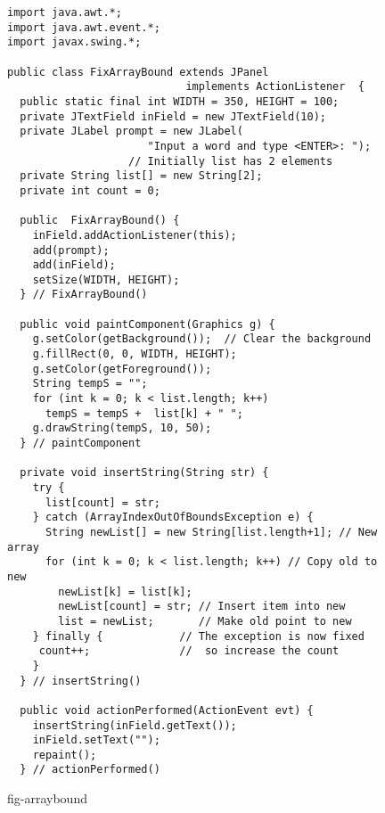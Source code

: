 \begin{figure}[p]
\jjjprogstart
\begin{jjjlisting}[29pc]
\begin{lstlisting}
import java.awt.*;
import java.awt.event.*;
import javax.swing.*;

public class FixArrayBound extends JPanel 
                            implements ActionListener  {
  public static final int WIDTH = 350, HEIGHT = 100;
  private JTextField inField = new JTextField(10);
  private JLabel prompt = new JLabel(
                      "Input a word and type <ENTER>: ");
                   // Initially list has 2 elements
  private String list[] = new String[2]; 
  private int count = 0;

  public  FixArrayBound() {
    inField.addActionListener(this);
    add(prompt);
    add(inField);
    setSize(WIDTH, HEIGHT);
  } // FixArrayBound()

  public void paintComponent(Graphics g) {
    g.setColor(getBackground());  // Clear the background
    g.fillRect(0, 0, WIDTH, HEIGHT);
    g.setColor(getForeground());
    String tempS = "";
    for (int k = 0; k < list.length; k++)
      tempS = tempS +  list[k] + " ";
    g.drawString(tempS, 10, 50);
  } // paintComponent

  private void insertString(String str) {
    try {
      list[count] = str;
    } catch (ArrayIndexOutOfBoundsException e) {
      String newList[] = new String[list.length+1]; // New array
      for (int k = 0; k < list.length; k++) // Copy old to new
        newList[k] = list[k];
        newList[count] = str; // Insert item into new
        list = newList;       // Make old point to new
    } finally {            // The exception is now fixed
     count++;              //  so increase the count
    }
  } // insertString()

  public void actionPerformed(ActionEvent evt) {
    insertString(inField.getText());
    inField.setText("");
    repaint();
  } // actionPerformed()
\end{lstlisting}
\end{jjjlisting}
{fig-arraybound}
\end{figure}

